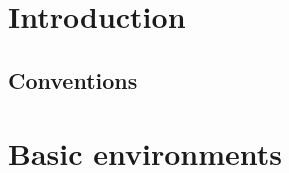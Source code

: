 \documentclass[english, a4, 12pt]{scrartcl}
\begin{document}

%				
%				
%				
	
\thispagestyle{empty}
\tableofcontents	
\clearpage	
\setcounter{page}{1}
\section{Introduction}
	\cite{JerusalemLectures}
	\subsection{Conventions}
\section{Basic environments}
	
%	 
%
%	
%	 	
%	
%			
%	
	
	
\end{document}
